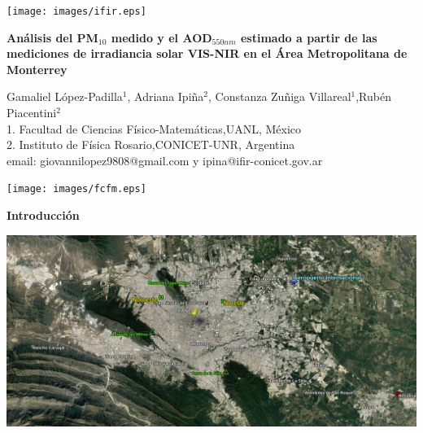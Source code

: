 \documentclass{article}
\begin{document}
\vspace*{-2cm}
\changefontsizes{14pt}
\hspace*{-1cm}
\begin{minipage}{0.2\linewidth}
\vspace{0.7cm}
\vspace*{-0.15cm}
\texttt{[image: images/ifir.eps]}
\end{minipage}
\vspace*{-0.4cm}
\begin{minipage}{0.6\linewidth}
\vspace*{0.7cm}
\begin{center}
\changefontsizes{15pt}
\hspace*{-0.1cm}
\textbf{\textcolor{title}{Análisis del PM$_{10}$ medido y el AOD$_{550nm}$ estimado a partir de las mediciones de irradiancia solar VIS-NIR en el Área Metropolitana de Monterrey}}
\end{center}
\vspace{-1cm}
\begin{center}
\changefontsizes{11pt}
Gamaliel López-Padilla$^1$, Adriana Ipiña$^{2}$, Constanza Zuñiga Villareal$^{1}$,Rubén Piacentini$^{2}$\\
1. Facultad de Ciencias Físico-Matemáticas,UANL, México\\
2. Instituto de Física Rosario,CONICET-UNR, Argentina\\
email: giovannilopez9808@gmail.com y ipina@ifir-conicet.gov.ar
\end{center}
\end{minipage}
\begin{minipage}{0.2\linewidth}
\hspace*{0.2cm}
\texttt{[image: images/fcfm.eps]}
\end{minipage}
\vspace{0.2cm}
\changefontsizes{12pt}
\begin{center}
\begin{shaded}
\textbf{\textcolor{ver}{Introducción}}
\end{shaded}
\end{center}
\begin{minipage}{0.47\linewidth}
\includegraphics[scale=0.101]{images/satelite.jpg}\\
\end{minipage}
\end{document}
